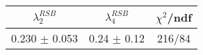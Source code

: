 \begin{tabular}{c|c||c}
$\lambda_{2}^{RSB}$ & $\lambda_4^{RSB}$ & $\chi^{2}$/ndf \\
\hline
0.230 $\pm$ 0.053 & 0.24 $\pm$ 0.12 & 216/84\\
\end{tabular}
